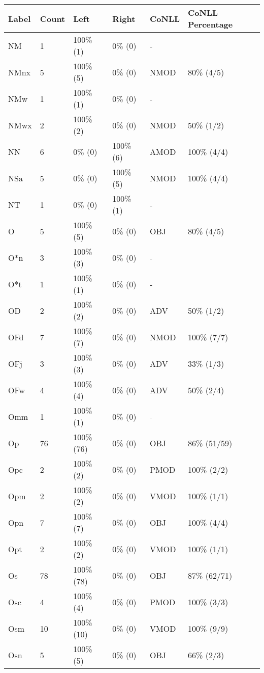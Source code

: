 \begin{figure*}
\begin{tabular}{|l|l|l|l||l|l|}
\hline
Label & Count & Left & Right & CoNLL & CoNLL Percentage\\ 
\hline
 NM & 1 & 100\% (1) & 0\% (0) & - &  \\ 
\hline
 NMnx & 5 & 100\% (5) & 0\% (0) & NMOD & 80\% (4/5) \\ 
\hline
 NMw & 1 & 100\% (1) & 0\% (0) & - &  \\ 
\hline
 NMwx & 2 & 100\% (2) & 0\% (0) & NMOD & 50\% (1/2) \\ 
\hline
 NN & 6 & 0\% (0) & 100\% (6) & AMOD & 100\% (4/4) \\ 
\hline
 NSa & 5 & 0\% (0) & 100\% (5) & NMOD & 100\% (4/4) \\ 
\hline
 NT & 1 & 0\% (0) & 100\% (1) & - &  \\ 
\hline
 O & 5 & 100\% (5) & 0\% (0) & OBJ & 80\% (4/5) \\ 
\hline
 O*n & 3 & 100\% (3) & 0\% (0) & - &  \\ 
\hline
 O*t & 1 & 100\% (1) & 0\% (0) & - &  \\ 
\hline
 OD & 2 & 100\% (2) & 0\% (0) & ADV & 50\% (1/2) \\ 
\hline
 OFd & 7 & 100\% (7) & 0\% (0) & NMOD & 100\% (7/7) \\ 
\hline
 OFj & 3 & 100\% (3) & 0\% (0) & ADV & 33\% (1/3) \\ 
\hline
 OFw & 4 & 100\% (4) & 0\% (0) & ADV & 50\% (2/4) \\ 
\hline
 Omm & 1 & 100\% (1) & 0\% (0) & - &  \\ 
\hline
 Op & 76 & 100\% (76) & 0\% (0) & OBJ & 86\% (51/59) \\ 
\hline
 Opc & 2 & 100\% (2) & 0\% (0) & PMOD & 100\% (2/2) \\ 
\hline
 Opm & 2 & 100\% (2) & 0\% (0) & VMOD & 100\% (1/1) \\ 
\hline
 Opn & 7 & 100\% (7) & 0\% (0) & OBJ & 100\% (4/4) \\ 
\hline
 Opt & 2 & 100\% (2) & 0\% (0) & VMOD & 100\% (1/1) \\ 
\hline
 Os & 78 & 100\% (78) & 0\% (0) & OBJ & 87\% (62/71) \\ 
\hline
 Osc & 4 & 100\% (4) & 0\% (0) & PMOD & 100\% (3/3) \\ 
\hline
 Osm & 10 & 100\% (10) & 0\% (0) & VMOD & 100\% (9/9) \\ 
\hline
 Osn & 5 & 100\% (5) & 0\% (0) & OBJ & 66\% (2/3) \\ 

\end{tabular}
\end{figure*}
